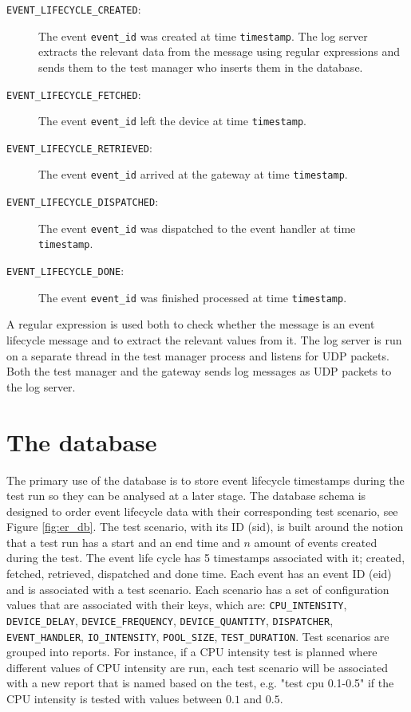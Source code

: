 \begin{description}

\item[\texttt{EVENT\_LIFECYCLE\_CREATED}:] The event \texttt{event\_id} was
created at time \texttt{timestamp}. The log server extracts the relevant data
from the message using regular expressions and sends them to the test manager
who inserts them in the database.

\item[\texttt{EVENT\_LIFECYCLE\_FETCHED}:] The event \texttt{event\_id} left
the device at time \texttt{timestamp}.

\item[\texttt{EVENT\_LIFECYCLE\_RETRIEVED}:] The event \texttt{event\_id}
arrived at the gateway at time \texttt{timestamp}.

\item[\texttt{EVENT\_LIFECYCLE\_DISPATCHED}:] The event \texttt{event\_id} was
dispatched to the event handler at time \texttt{timestamp}.

\item[\texttt{EVENT\_LIFECYCLE\_DONE}:] The event \texttt{event\_id} was
finished processed at time \texttt{timestamp}.

\end{description}

A regular expression is used both to check whether the message is an event
lifecycle message and to extract the relevant values from it. The log server is
run on a separate thread in the test manager process and listens for UDP
packets. Both the test manager and the gateway sends log messages as UDP
packets to the log server.

\section{The database}

The primary use of the database is to store event lifecycle timestamps during
the test run so they can be analysed at a later stage. The database schema is
designed to order event lifecycle data with their corresponding test scenario,
see Figure \ref{fig:er_db}. The test scenario, with its ID (sid), is built
around the notion that a test run has a start and an end time and $n$ amount of
events created during the test. The event life cycle has 5 timestamps
associated with it; created, fetched, retrieved, dispatched and done time. Each
event has an event ID (eid) and is associated with a test scenario. Each
scenario has a set of configuration values that are associated with their keys,
which are: \texttt{CPU\_INTENSITY}, \texttt{DEVICE\_DELAY},
\texttt{DEVICE\_FREQUENCY}, \texttt{DEVICE\_QUANTITY}, \texttt{DISPATCHER},
\texttt{EVENT\_HANDLER}, \texttt{IO\_INTENSITY}, \texttt{POOL\_SIZE},
\texttt{TEST\_DURATION}. Test scenarios are grouped into reports. For instance,
if a CPU intensity test is planned where different values of CPU intensity are
run, each test scenario will be associated with a new report that is named
based on the test, e.g. "test cpu 0.1-0.5" if the CPU intensity is tested with
values between $0.1$ and $0.5$.

